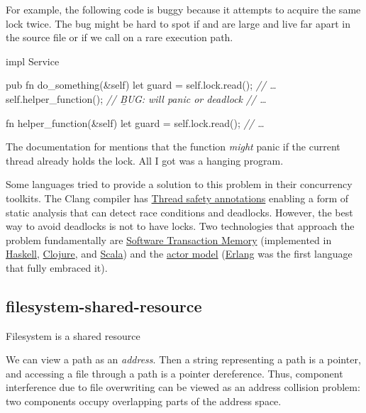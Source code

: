 \documentclass{article}
\begin{document}
For example, the following code is buggy because it attempts to acquire the same lock twice.
The bug might be hard to spot if  and  are large and live far apart in the source file or if we call  on a rare execution path.

\begin{code}[bad]
impl Service {
  pub fn do_something(&self) {
    let guard = self.lock.read();
    \emph{// \ldots }
    self.helper_function(); \emph{// \b{BUG}: will panic or deadlock}
    \emph{// \ldots }
  }

  fn helper_function(&self) {
    let guard = self.lock.read();
    \emph{// \ldots }
  }
}
\end{code}

The documentation for \href{https://doc.rust-lang.org/std/sync/struct.RwLock.html#method.read}{} mentions that the function \emph{might} panic if the current thread already holds the lock.
All I got was a hanging program.

Some languages tried to provide a solution to this problem in their concurrency toolkits.
The Clang compiler has \href{https://clang.llvm.org/docs/ThreadSafetyAnalysis.html}{Thread safety annotations} enabling a form of static analysis that can detect race conditions and deadlocks.
However, the best way to avoid deadlocks is not to have locks.
Two technologies that approach the problem fundamentally are \href{https://en.wikipedia.org/wiki/Software_transactional_memory}{Software Transaction Memory} (implemented in \href{https://wiki.haskell.org/Software_transactional_memory}{Haskell}, \href{https://clojure.org/reference/refs}{Clojure}, and \href{https://nbronson.github.io/scala-stm/}{Scala}) and the \href{https://en.wikipedia.org/wiki/Actor_model}{actor model} (\href{https://www.erlang.org/}{Erlang} was the first language that fully embraced it).

\subsection{filesystem-shared-resource}{Filesystem is a shared resource}
\epigraph{
    We can view a path as an \emph{address}.
    Then a string representing a path is a pointer, and accessing a file through a path is a pointer dereference.
    Thus, component interference due to file overwriting can be viewed as an address collision problem: two components occupy overlapping parts of the address space.
}{}
\end{document}
